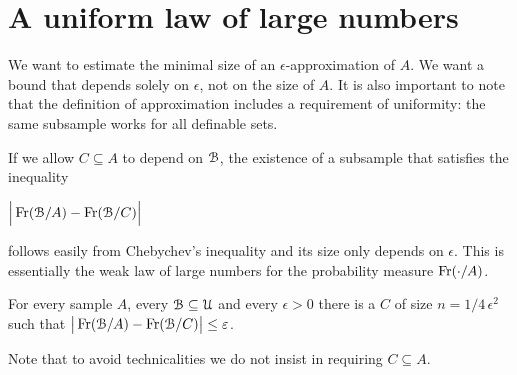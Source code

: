 \documentclass[sputnik.tex]{subfiles}
\begin{document}
\section{A uniform law of large numbers}

\def\ceq#1#2#3{\parbox[t]{35ex}{$\displaystyle #1$}\medrel{#2}{$\displaystyle #3$}}

We want to estimate the minimal size of an $\epsilon$-approximation of $A$.
We want a bound that depends solely on $\epsilon$, not on the size of $A$.
It is also important to note that the definition of approximation includes a requirement of uniformity: the same subsample works for all definable sets.

If we allow $C\subseteq A$ to depend on $\EuScript B$, the existence of a subsample that satisfies the inequality 

\ceq{\hfill\displaystyle \Big|\Fr(\B/A) - \Fr(\B/C)\Big|}{\le}{\epsilon}

follows easily from Chebychev's inequality and its size only depends on $\epsilon$. This is essentially the weak law of large numbers for the probability measure $\mathop{\rm Fr}(\cdot/A)$.

\def\ceq#1#2#3{\parbox[t]{25ex}{$\displaystyle #1$}\medrel{#2}{$\displaystyle #3$}}

\begin{proposition}
For every sample $A$, every $\EuScript B\subseteq\EuScript U$ and every $\epsilon>0$ there is a $C$ of size $n=1/4\,\epsilon^2$ such that $\big|\mathop{\rm Fr}(\EuScript B/A) - \mathop{\rm Fr}(\EuScript B/C)\big|\le\varepsilon$.
\end{proposition}
% 
% 
% 

 Note that to avoid technicalities we do not insist in requiring $C\subseteq A$.
\end{document}

